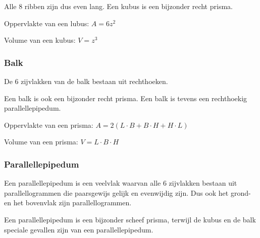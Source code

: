 Alle 8 ribben zijn dus even lang. Een kubus is een bijzonder recht prisma.



		
\begin{ftonthoud}
		Oppervlakte van een lubus: $A=6z^2$
		
		Volume van een kubus: $V=z^3$
\end{ftonthoud}
		

\subsubsection{Balk}
\begin{definitie}
	De 6 zijvlakken van de balk bestaan uit rechthoeken. 
\end{definitie}

Een balk is ook een bijzonder recht prisma.
Een balk is tevens een rechthoekig parallellepipedum.




\begin{ftonthoud}
			
		Oppervlakte van een prisma: $A=2(L\cdot B+B\cdot H+H\cdot L)$
		
		Volume van een prisma: $V=L\cdot B\cdot H$

\end{ftonthoud}

\subsubsection{Parallellepipedum}
\begin{definitie}
	Een parallellepipedum is een veelvlak waarvan alle 6 zijvlakken bestaan uit parallellogrammen die paarsgewijs gelijk en evenwijdig zijn. Dus ook het grond- en het bovenvlak zijn parallellogrammen. 

\end{definitie}
Een parallellepipedum is een bijzonder scheef prisma, terwijl de kubus en de balk speciale gevallen zijn van een parallellepipedum.

